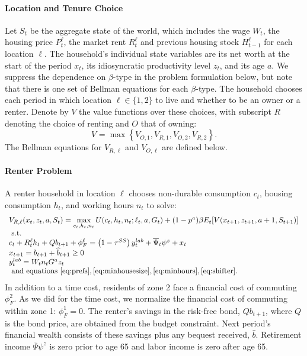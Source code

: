 \documentclass[letterpaper,12pt,dvipsnames,usenames]{article}
\theoremstyle{definition}
\begin{document}
\begin{spacing}{1.25}
\paragraph{Location and Tenure Choice}
Let $S_{t}$ be the aggregate state of the world, which includes the wage $W_{t}$, the housing price $P^{\ell}_{t}$, the market rent $R^{\ell}_{t}$ and previous housing stock $H^{\ell}_{t-1}$ for each location $\ell$. The household's individual state variables are its net worth at the start of the period $x_t$, its idiosyncratic productivity level $z_t$, and its age $a$. We suppress the dependence on $\beta$-type in the problem formulation below, but note that there is one set of Bellman equations for each $\beta$-type. The household chooses each period in which location $\ell \in \{1,2\}$ to live and whether to be an owner or a renter. Denote by $V$ the value functions over these choices, with subscript $R$ denoting the choice of renting and $O$ that  of owning: \[V_{}=\max \left\{V_{O,1}, V_{R,1}, V_{O,2}, V_{R,2}\right\}.\]
The Bellman equations for $V_{R,\ell}$ and $V_{O,\ell}$ are defined below.


\paragraph{Renter Problem}
A renter household in location $\ell$ chooses non-durable consumption $c_{t}$, housing consumption $h_{t}$, and working hours $n_{t}$ to solve:
\begin{equation*}
\begin{array}{l}
V_{R,\ell}(x_{t},z_{t},a,S_{t})=\max\limits_{c_{t},h_{t},n_{t}}U(c_{t},h_{t},n_{t};\ell_{t},a,G_{t})+(1-p^{a})\beta E_{t}[V(x_{t+1},z_{t+1},a+1,S_{t+1})]\\ \text{   s.t.  }\\
c_{t} + R^{\ell}_{t} h_{t} + Q b_{t+1} + \phi^{\ell}_{F} = \left(1-\tau^{SS}\right)y^{lab}_t + \overline{\Psi}_t \psi^{z} + x_{t} \\
x_{t+1}=b_{t+1}+\widehat{b}_{t+1}\ge0\\
y_t^{lab} = W_{t}n_{t}G^{a}z_{t} \\
\text{  and equations } \eqref{eq:prefs}, \eqref{eq:minhousesize}, \eqref{eq:minhours}, \eqref{eq:shifter}.
\end{array}
\end{equation*}
In addition to a time cost, residents of zone 2 face a financial cost of commuting $\phi^{2}_{F}$. As we did for the time cost, we normalize the financial cost of commuting within zone 1: $\phi^{1}_{F}=0$.  The renter's savings in the risk-free bond, $Qb_{t+1}$, where $Q$ is the bond price, are obtained from the budget constraint. Next period's financial wealth consists of these savings plus any bequest received, $\widehat{b}$. Retirement income $\overline{\Psi}\psi^{z}$ is zero prior to age 65 and labor income is zero after age 65.


\end{spacing}
\end{document}
